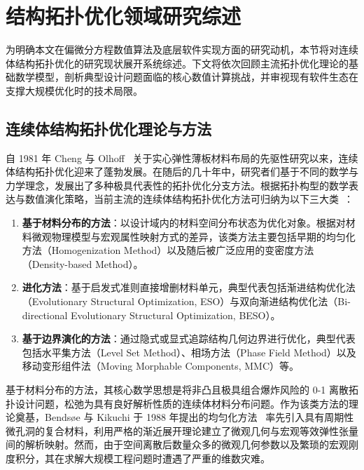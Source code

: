 \section{结构拓扑优化领域研究综述}
\label{sec:literature_review}

为明确本文在偏微分方程数值算法及底层软件实现方面的研究动机，本节将对连续体结构拓扑优化的研究现状展开系统综述。下文将依次回顾主流拓扑优化理论的基础数学模型，剖析典型设计问题面临的核心数值计算挑战，并审视现有软件生态在支撑大规模优化时的技术局限。


\subsection{连续体结构拓扑优化理论与方法}
\label{subsec:continuum_topo_opt_methods}

自 1981 年 Cheng 与 Olhoff~\cite{chengInvestigationConcerningOptimal1981} 关于实心弹性薄板材料布局的先驱性研究以来，连续体结构拓扑优化迎来了蓬勃发展。在随后的几十年中，研究者们基于不同的数学与力学理念，发展出了多种极具代表性的拓扑优化分支方法。根据拓扑构型的数学表达与数值演化策略，当前主流的连续体结构拓扑优化方法可归纳为以下三大类~\cite{rozvanyCriticalReviewEstablished2009, deatonSurveyStructuralMultidisciplinary2014a, JieGouTuoBuYouHuaShuZhiFangFaYanJiuJinZhan}：

\begin{enumerate}[
	label={（\arabic*）},
	labelsep=0.25em,
	leftmargin=3.2em,
	itemsep=0.4em,
	topsep=0.4em,
	parsep=0pt,
	partopsep=0pt
	]
	\item \textbf{基于材料分布的方法}：以设计域内的材料空间分布状态为优化对象。根据对材料微观物理模型与宏观属性映射方式的差异，该类方法主要包括早期的均匀化方法（Homogenization Method）以及随后被广泛应用的变密度方法（Density-based Method）。
	
	\item \textbf{进化方法}：基于启发式准则直接增删材料单元，典型代表包括渐进结构优化法（Evolutionary Structural Optimization, ESO）与双向渐进结构优化法（Bi-directional Evolutionary Structural Optimization, BESO）。
	
	\item \textbf{基于边界演化的方法}：通过隐式或显式追踪结构几何边界进行优化，典型代表包括水平集方法（Level Set Method）、相场方法（Phase Field Method）以及移动变形组件法（Moving Morphable Components, MMC）等。
\end{enumerate}

基于材料分布的方法，其核心数学思想是将非凸且极具组合爆炸风险的 0-1 离散拓扑设计问题，松弛为具有良好解析性质的连续体材料分布问题。作为该类方法的理论奠基，Bendsøe 与 Kikuchi 于 1988 年提出的均匀化方法~\cite{bendsoeGeneratingOptimalTopologies1988} 率先引入具有周期性微孔洞的复合材料，利用严格的渐近展开理论建立了微观几何与宏观等效弹性张量间的解析映射。然而，由于空间离散后数量众多的微观几何参数以及繁琐的宏观刚度积分，其在求解大规模工程问题时遭遇了严重的维数灾难。

